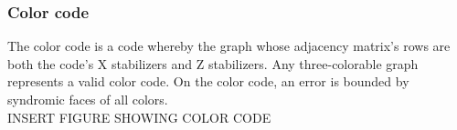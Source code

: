 \subsubsection{Color code}
The color code is a code whereby the graph whose adjacency matrix's 
rows are both the code's X stabilizers and Z stabilizers.
Any three-colorable graph represents a valid color code.
On the color code, an error is bounded by syndromic faces of all colors.
\\
INSERT FIGURE SHOWING COLOR CODE